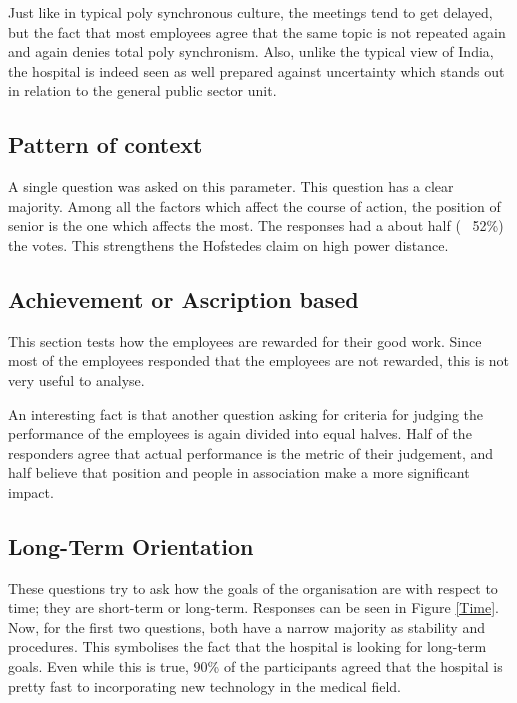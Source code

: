 \documentclass[12pt]{article}
\begin{document}
Just like in typical poly synchronous culture, the meetings tend to get delayed, but the fact that most employees agree that the same topic is not repeated again and again denies total poly synchronism. Also, unlike the typical view of India, the hospital is indeed seen as well prepared against uncertainty which stands out in relation to the general public sector unit.

\subsection{Pattern of context}

A single question was asked on this parameter. This question has a clear majority. Among all the factors which affect the course of action, the position of senior is the one which affects the most. The responses had a about half (~ 52\%) the votes. This strengthens the Hofstedes claim on high power distance.

\subsection{Achievement or Ascription based}

This section tests how the employees are rewarded for their good work. Since most of the employees responded that the employees are not rewarded, this is not very useful to analyse.

An interesting fact is that another question asking for criteria for judging the performance of the employees is again divided into equal halves. Half of the responders agree that actual performance is the metric of their judgement, and half believe that position and people in association make a more significant impact.

\subsection{Long-Term Orientation}

These questions try to ask how the goals of the organisation are with respect to time; they are short-term or long-term. Responses can be seen in Figure \ref{Time}. Now, for the first two questions, both have a narrow majority as stability and procedures. This symbolises the fact that the hospital is looking for long-term goals. Even while this is true, 90\% of the participants agreed that the hospital is pretty fast to incorporating new technology in the medical field.
\end{document}
